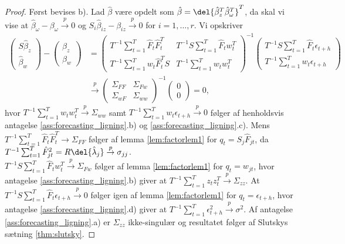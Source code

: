 \begin{proof}
Først bevises b). 
Lad \(\hat{\beta}\) være opdelt som \(\hat{\beta} = \del{\hat{\beta}_z^T \hat{\beta}_\omega^T}^T\), da skal vi vise at \(\hat{\beta}_\omega - \beta_\omega \overset{p}{\rightarrow} 0\) og \(S_i \hat{\beta}_{iz} - \beta_{iz} \overset{p}{\rightarrow} 0\) for \(i = 1, \ldots, r\).
Vi opskriver
\begin{align*}
\begin{pmatrix}
S \hat{\beta}_z \\ \hat{\beta}_w
\end{pmatrix} - \begin{pmatrix}
\beta_z \\ \beta_w
\end{pmatrix} &= \begin{pmatrix}
T^{-1} \sum_{t=1}^T \hat{F}_t \hat{F}_t^T & T^{-1} S \sum_{t=1}^T \hat{F}_t w_t^T \\
T^{-1} \sum_{t=1}^T w_t \hat{F}_t^T S & T^{-1} \sum_{t=1}^T w_t w_t^T
\end{pmatrix}^{-1} \begin{pmatrix}
T^{-1} S \sum_{t=1}^T \hat{F}_t \epsilon_{t+h} \\
T^{-1} \sum_{t=1}^T w_t \epsilon_{t+h}
\end{pmatrix} \\
&\overset{p}{\rightarrow} \begin{pmatrix}
\Sigma_{FF} & \Sigma_{Fw} \\ \Sigma_{wF} & \Sigma_{ww}   
\end{pmatrix}^{-1} \begin{pmatrix}
0 \\ 0
\end{pmatrix} = 0,
\end{align*}
hvor 
\(T^{-1} \sum_{t=1}^T w_t w_t^T \overset{p}{\rightarrow} \Sigma_{ww}\) samt \(T^{-1} \sum_{t=1}^T w_t \epsilon_{t+h} \overset{p}{\rightarrow} 0\) følger af henholdsvis antagelse \ref{ass:forecasting_ligning}.b) og \ref{ass:forecasting_ligning}.c).
Mens \(T^{-1} \sum_{t=1}^T \hat{F}_t \hat{F}_t^T \rightarrow \Sigma_{FF}\) følger af lemma \ref{lem:factorlem1} for \(q_t = S_j \hat{F}_{jt}\), da \(T^{-1} \sum_{t=1}^T \hat{F}_{jt}^2 = R \del{\hat{\lambda}_j} \overset{p}{\rightarrow} \sigma_{jj}\).\\
\(T^{-1} S \sum_{t=1}^T \hat{F}_t w_t^T \overset{p}{\rightarrow} \Sigma_{Fw}\) følger af  lemma \ref{lem:factorlem1} for \(q_t = w_{jt}\), hvor antagelse \ref{ass:forecasting_ligning}.b) giver at \(T^{-1} \sum_{t=1}^T z_t z_t^T \overset{p}{\rightarrow} \Sigma_{zz}\).
At \(T^{-1} S \sum_{t=1}^T \hat{F}_t \epsilon_{t+h} \overset{p}{\rightarrow} 0\) følger igen af lemma \ref{lem:factorlem1} for \(q_t = \epsilon_{t+h}\), hvor antagelse \ref{ass:forecasting_ligning}.d) giver at \(T^{-1} \sum_{t=1}^T \epsilon_{t+h}^2 \overset{p}{\rightarrow} \sigma^2\).
Af antagelse \ref{ass:forecasting_ligning}.a) er \(\Sigma_{zz}\) ikke-singulær og resultatet følger af Slutskys sætning \ref{thm:slutsky}.


\end{proof}
